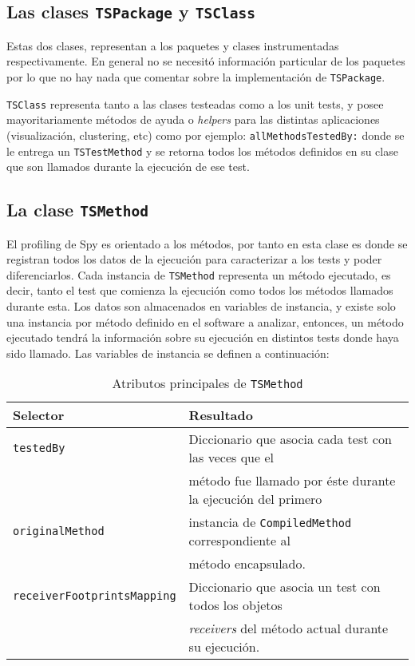 \subsection{Las clases {\tt TSPackage} y {\tt TSClass}}

\par Estas dos clases, representan a los paquetes y clases instrumentadas respectivamente. En general no se necesitó información particular de los paquetes por lo que no hay nada que comentar sobre la implementación de {\tt TSPackage}.

\par {\tt TSClass} representa tanto a las clases testeadas como a los unit tests, y posee mayoritariamente métodos de ayuda o \emph{helpers} para las distintas aplicaciones (visualización, clustering, etc) como por ejemplo: {\tt allMethodsTestedBy:} donde se le entrega un {\tt TSTestMethod} y se retorna todos los métodos definidos en su clase que son llamados durante la ejecución de ese test.  

\subsection{La clase {\tt TSMethod} }
\par El profiling de Spy es orientado a los métodos, por tanto en esta clase es donde se registran todos los datos de la ejecución para caracterizar a los tests y poder diferenciarlos. Cada instancia de {\tt TSMethod} representa un método ejecutado, es decir, tanto el test que comienza la ejecución como todos los métodos llamados durante esta. Los datos son almacenados en variables de instancia, y existe solo una instancia por método definido en el software a analizar, entonces, un método ejecutado tendrá la información sobre su ejecución en distintos tests donde haya sido llamado. Las variables de instancia se definen a continuación:

\begin{table}[h] 
    \centering 
    \begin{tabular}{|l|l|}
    	\hline
\textbf{Selector} & \textbf{Resultado} \\ \hline \hline
{\tt testedBy}	& Diccionario que asocia cada test con las veces que el \\
				& método fue llamado por éste durante la ejecución del primero\\ \hline
{\tt originalMethod} & instancia de {\tt CompiledMethod} correspondiente al  \\
						& método encapsulado. \\ \hline
{\tt receiverFootprintsMapping} & Diccionario que asocia un test con todos los objetos \\
						& \emph{receivers} del método actual durante su ejecución. \\ \hline
    \end{tabular}
    \caption{Atributos principales de {\tt TSMethod}}
\end{table} 

